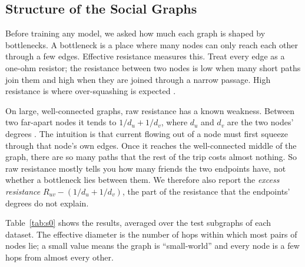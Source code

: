 \subsection{Structure of the Social Graphs}
Before training any model, we asked how much each graph is shaped by bottlenecks. A bottleneck is a place where many nodes can only reach each other through a few edges. Effective resistance measures this. Treat every edge as a one-ohm resistor; the resistance between two nodes is low when many short paths join them and high when they are joined through a narrow passage. High resistance is where over-squashing is expected \citep{black2023}.

On large, well-connected graphs, raw resistance has a known weakness. Between two far-apart nodes it tends to $1/d_u + 1/d_v$, where $d_u$ and $d_v$ are the two nodes' degrees \citep{f_vonluxburg2014}. The intuition is that current flowing out of a node must first squeeze through that node's own edges. Once it reaches the well-connected middle of the graph, there are so many paths that the rest of the trip costs almost nothing. So raw resistance mostly tells you how many friends the two endpoints have, not whether a bottleneck lies between them. We therefore also report the \emph{excess resistance} $R_{uv} - (1/d_u + 1/d_v)$, the part of the resistance that the endpoints' degrees do not explain.

Table~\ref{tab:s0} shows the results, averaged over the test subgraphs of each dataset. The effective diameter is the number of hops within which most pairs of nodes lie; a small value means the graph is ``small-world'' and every node is a few hops from almost every other.

